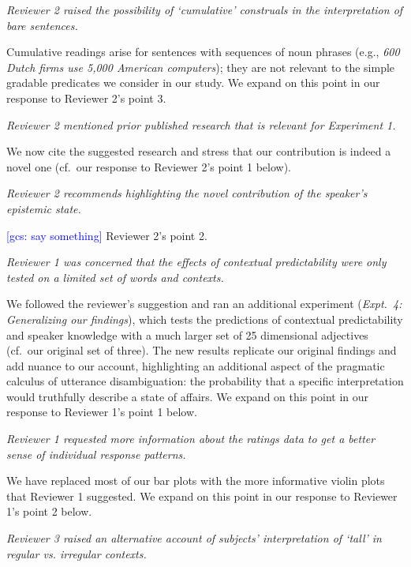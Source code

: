 \documentclass[12pt]{article}
\newcommand{\gcs}[1]{\textcolor{blue}{[gcs: #1]}}
\begin{document}
\item \emph{Reviewer 2 raised the possibility of `cumulative' construals in the interpretation of bare sentences.}

Cumulative readings arise for sentences with sequences of noun phrases (e.g., \emph{600 Dutch firms use 5,000 American computers}); they are not relevant to the simple gradable predicates we consider in our study. We expand on this point in our response to Reviewer 2's point 3.

\item \emph{Reviewer 2 mentioned prior published research that is relevant for Experiment 1.}

We now cite the suggested research and stress that our contribution is indeed a novel one (cf.~our response to Reviewer 2's point 1 below).

\item \emph{Reviewer 2 recommends highlighting the novel contribution of the speaker's epistemic state.}

\gcs{say something} Reviewer 2's point 2.

\item \emph{Reviewer 1 was concerned that the effects of contextual predictability were only tested on a limited set of words and contexts.}

We followed the reviewer's suggestion and ran an additional experiment (\emph{Expt.~4: Generalizing our findings}), which tests the predictions of contextual predictability and speaker knowledge with a much larger set of 25 dimensional adjectives (cf.~our original set of three). The new results replicate our original findings and add nuance to our account, highlighting an additional aspect of the pragmatic calculus of utterance disambiguation: the probability that a specific interpretation would truthfully describe a state of affairs. We expand on this point in our response to Reviewer 1's point 1 below.

\item \emph{Reviewer 1 requested more information about the ratings data to get a better sense of individual response patterns.}

We have replaced most of our bar plots with the more informative violin plots that Reviewer 1 suggested. We expand on this point in our response to Reviewer 1's point 2 below.

\item \emph{Reviewer 3 raised an alternative account of subjects' interpretation of `tall' in regular vs. irregular contexts.}
\end{document}
